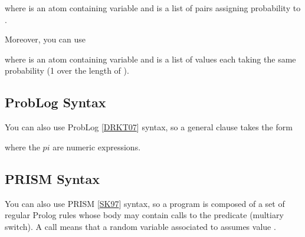 \documentclass[letterpaper,10pt,english]{sphinxmanual}
\begin{document}
\sphinxAtStartPar
where  is an atom containing variable  and  is a list of pairs  assigning probability  to .

\sphinxAtStartPar
Moreover, you can use

\begin{sphinxVerbatim}[commandchars=\\\{\}]
\end{sphinxVerbatim}

\sphinxAtStartPar
where  is an atom containing variable  and  is a list of values each taking the same probability (1 over the length of ).


\subsection{ProbLog Syntax}
\label{\detokenize{index:problog-syntax}}
\sphinxAtStartPar
You can also use ProbLog {[}\hyperlink{cite.index:id51}{DRKT07}{]} syntax, so a general clause takes the form

\begin{sphinxVerbatim}[commandchars=\\\{\}]
      
\end{sphinxVerbatim}

\sphinxAtStartPar
where the \(pi\) are numeric expressions.


\subsection{PRISM Syntax}
\label{\detokenize{index:prism-syntax}}
\sphinxAtStartPar
You can also use PRISM {[}\hyperlink{cite.index:id52}{SK97}{]} syntax, so a program is composed of a set of regular Prolog rules whose body may contain calls to the  predicate (multi\sphinxhyphen{}ary switch).
A call  means that a random variable associated to  assumes value .
\end{document}
